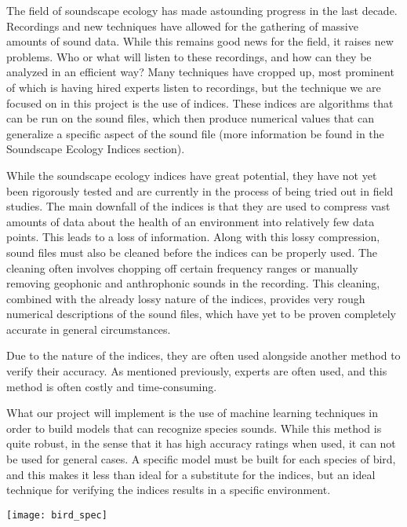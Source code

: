 The field of soundscape ecology has made astounding progress in the last decade.
Recordings and new techniques have allowed for the gathering of massive amounts of sound data. While this remains good news for the field, it raises new problems. Who or what will listen to these recordings, and how can they be analyzed in an efficient way? Many techniques have cropped up, most prominent of which is having hired experts listen to recordings, but the technique we are focused on in this project is the use of indices. These indices are algorithms that can be run on the sound files, which then produce numerical values that can generalize a specific aspect of the sound file (more information be found in the Soundscape Ecology Indices section).\par
While the soundscape ecology indices have great potential, they have not yet been rigorously tested and are currently in the process of being tried out in field studies. The main downfall of the indices is that they are used to compress vast amounts of data about the health of an environment into relatively few data points. This leads to a loss of information. Along with this lossy compression, sound files must also be cleaned before the indices can be properly used. The cleaning often involves chopping off certain frequency ranges or manually removing geophonic and anthrophonic sounds in the recording. This cleaning, combined with the already lossy nature of the indices, provides very rough numerical descriptions of the sound files, which have yet to be proven completely accurate in general circumstances.\par
Due to the nature of the indices, they are often used alongside another method to verify their accuracy. As mentioned previously, experts are often used, and this method is often costly and time-consuming.\par
What our project will implement is the use of machine learning techniques in order to build models that can recognize species sounds. While this method is quite robust, in the sense that it has high accuracy ratings when used, it can not be used for general cases. A specific model must be built for each species of bird, and this makes it less than ideal for a substitute for the indices, but an ideal technique for verifying the indices results in a specific environment.\par
\begin{center}
	\texttt{[image: bird\_spec]}
\end{center}
